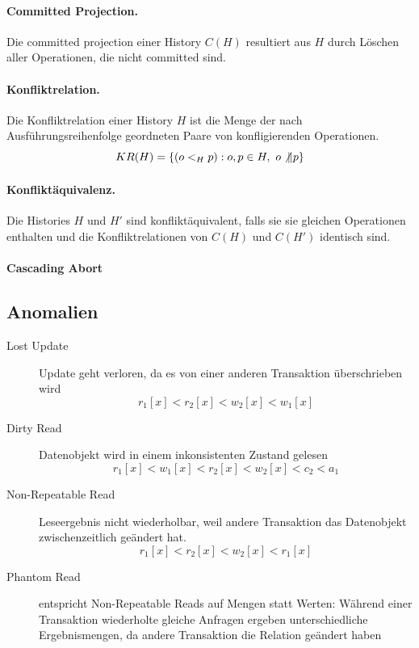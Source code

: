 \documentclass[]{scrartcl}
\begin{document}
\paragraph{Committed Projection.} Die committed projection einer History $C(H)$ resultiert aus $H$ durch L\"oschen aller Operationen, die nicht committed sind.


\paragraph{Konfliktrelation.} Die Konfliktrelation einer History $H$ ist die Menge der nach Ausf\"uhrungsreihenfolge geordneten Paare von konfligierenden Operationen.
$$KR(H) = \{ (o <_{H} p ) : o, p \in H, \  o \not \| p \}$$

\paragraph{Konflikt\"aquivalenz.} Die Histories $H$ und $H'$ sind konflikt\"aquivalent, falls sie sie gleichen Operationen enthalten und die Konfliktrelationen von $C(H)$ und $C(H')$ identisch sind.


\paragraph{Cascading Abort}


\subsection{Anomalien}

\begin{description}
\item[Lost Update] Update geht verloren, da es von einer anderen Transaktion \"uberschrieben wird
$$r_{1}[x] < r_{2}[x] < w_{2}[x] < w_{1}[x]$$ 
\item[Dirty Read] Datenobjekt wird in einem inkonsistenten Zustand gelesen
$$r_{1}[x] < w_{1}[x] < r_{2}[x] < w_{2}[x] < c_{2} < a_{1}$$
\item[Non-Repeatable Read] Leseergebnis nicht wiederholbar, weil andere Transaktion das Datenobjekt zwischenzeitlich ge\"andert hat.
$$r_{1}[x] < r_{2}[x] < w_{2}[x] < r_{1} [x]$$
\item[Phantom Read] entspricht Non-Repeatable Reads auf Mengen statt Werten: W\"ahrend einer Transaktion wiederholte gleiche Anfragen ergeben unterschiedliche Ergebnismengen, da andere Transaktion die Relation ge\"andert haben
\end{description}
\end{document}
